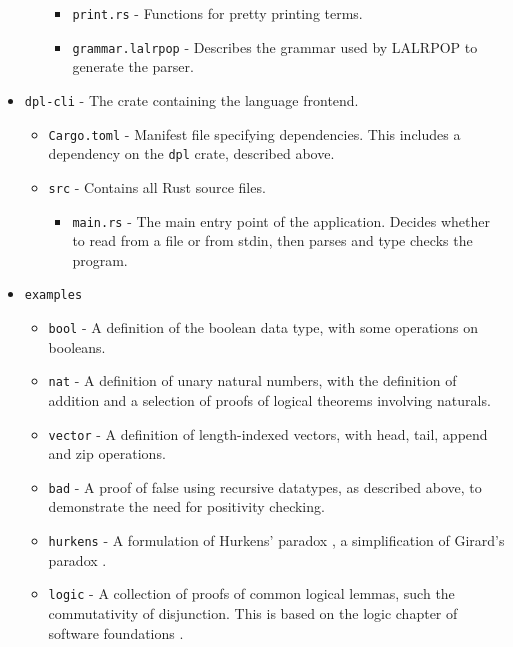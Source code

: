 \documentclass[12pt,a4paper,twoside]{report}
\begin{document}
\begin{itemize}
\begin{itemize}
\begin{itemize}
                        \item \texttt{print.rs} - Functions for pretty printing terms.
                        \item \texttt{grammar.lalrpop} - Describes the grammar used by LALRPOP to generate the parser.
                    \end{itemize}
          \end{itemize}
    \item \texttt{dpl-cli} - The crate containing the language frontend.
          \begin{itemize}
              \item \texttt{Cargo.toml} - Manifest file specifying dependencies. This includes a dependency on the \texttt{dpl} crate, described above.
              \item \texttt{src} - Contains all Rust source files.
                    \begin{itemize}
                        \item \texttt{main.rs} - The main entry point of the application. Decides whether to read from a file or from stdin, then parses and type checks the program.
                    \end{itemize}
          \end{itemize}
    \item \texttt{examples}
        \begin{itemize}
              \item \texttt{bool} - A definition of the boolean data type, with some operations on booleans.
              \item \texttt{nat} - A definition of unary natural numbers, with the definition of addition and a selection of proofs of logical theorems involving naturals.
              \item \texttt{vector} - A definition of length-indexed vectors, with head, tail, append and zip operations.
              \item \texttt{bad} - A proof of false using recursive datatypes, as described above, to demonstrate the need for positivity checking. 
              \item \texttt{hurkens} - A formulation of Hurkens' paradox \cite{hurkens95}, a simplification of Girard's paradox \cite{girard72}.
              \item \texttt{logic} - A collection of proofs of common logical lemmas, such the commutativity of disjunction. This is based on the logic chapter of software foundations \cite{pierce18}.
          \end{itemize}
\end{itemize}
\end{document}
